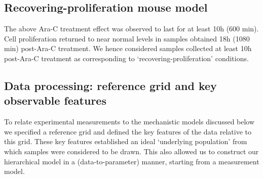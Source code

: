 \documentclass[10pt,letterpaper]{article}
\begin{document}
\subsection{Recovering-proliferation mouse
model}\label{recovering-proliferation-mouse-model}

The above Ara-C treatment effect was observed to last for at least 10h
(600 min). Cell proliferation returned to near normal levels in samples
obtained 18h (1080 min) post-Ara-C treatment. We hence considered
samples collected at least 10h post-Ara-C treatment as corresponding to
`recovering-proliferation' conditions.

\subsection{Data processing: reference grid and key observable
features}\label{data-processing-reference-grid-and-key-observable-features}

To relate experimental measurements to the mechanistic models discussed
below we specified a reference grid and defined the key features of the
data relative to this grid. These key features established an ideal
`underlying population' from which samples were considered to be drawn.
This also allowed us to construct our hierarchical model in a
(data-to-parameter) manner, starting from a measurement model.
\end{document}
